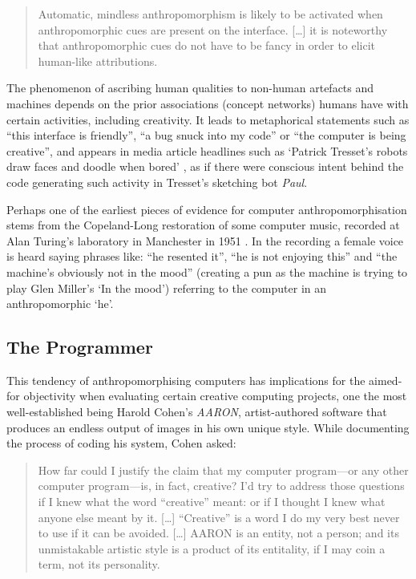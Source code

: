 \begin{quotation}
  Automatic, mindless anthropomorphism is likely to be activated when anthropomorphic cues are present on the interface. [\ldots] it is noteworthy that anthropomorphic cues do not have to be fancy in order to elicit human-like attributions. 
\end{quotation}

The phenomenon of ascribing human qualities to non-human artefacts and machines depends on the prior associations (concept networks) humans have with certain activities, including creativity. It leads to metaphorical statements such as ``this interface is friendly'', ``a bug snuck into my code'' or ``the computer is being creative'', and appears in media article headlines such as `Patrick Tresset\rq s robots draw faces and doodle when bored' \autocite{Wired2011}, as if there were conscious intent behind the code generating such activity in Tresset's sketching bot \textit{Paul}.

Perhaps one of the earliest pieces of evidence for computer anthropomorphisation stems from the Copeland-Long restoration of some computer music, recorded at Alan Turing's laboratory in Manchester in 1951 \autocite{Copeland2016}. In the recording a female voice is heard saying phrases like: ``he resented it'', ``he is not enjoying this'' and ``the machine's obviously not in the mood'' (creating a pun as the machine is trying to play Glen Miller's `In the mood') referring to the computer in an anthropomorphic `he'.


\subsection{The Programmer}
\label{s:programmer}

This tendency of anthropomorphising computers has implications for the aimed-for objectivity when evaluating certain creative computing projects, one the most well-established being Harold Cohen's \textit{AARON}, artist-authored software that produces an endless output of images in his own unique style. While documenting the process of coding his system, Cohen asked:

\begin{quotation}
  How far could I justify the claim that my computer program---or any other computer program---is, in fact, creative? I'd try to address those questions if I knew what the word ``creative'' meant: or if I thought I knew what anyone else meant by it. [\ldots] ``Creative'' is a word I do my very best never to use if it can be avoided. [\ldots] AARON is an entity, not a person; and its unmistakable artistic style is a product of its entitality, if I may coin a term, not its personality. 
\end{quotation}

